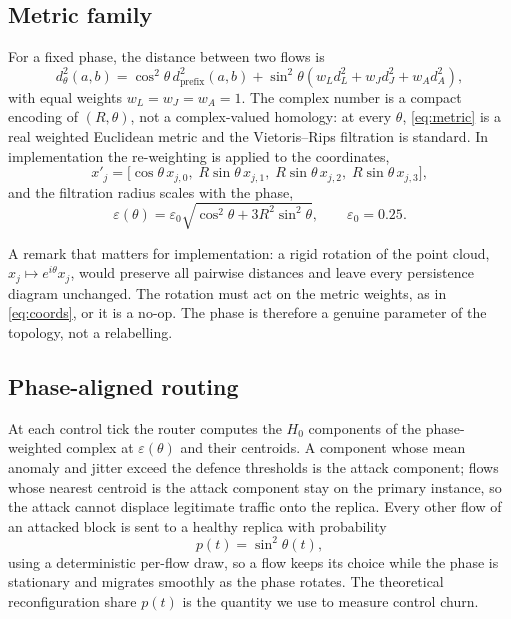 \documentclass[10pt,a4paper]{article}
\begin{document}
\subsection{Metric family}
For a fixed phase, the distance between two flows is
\begin{equation}
d_\theta^2(a,b)=\cos^2\theta\,d^2_{\mathrm{prefix}}(a,b)
+\sin^2\theta\left(w_L d_L^2+w_J d_J^2+w_A d_A^2\right),
\label{eq:metric}
\end{equation}
with equal weights $w_L=w_J=w_A=1$. The complex number is a compact encoding of
$(R,\theta)$, not a complex-valued homology: at every $\theta$, \eqref{eq:metric}
is a real weighted Euclidean metric and the Vietoris--Rips filtration is standard.
In implementation the re-weighting is applied to the coordinates,
\begin{equation}
x'_j=\big[\cos\theta\,x_{j,0},\; R\sin\theta\,x_{j,1},\;
R\sin\theta\,x_{j,2},\; R\sin\theta\,x_{j,3}\big],
\label{eq:coords}
\end{equation}
and the filtration radius scales with the phase,
\begin{equation}
\varepsilon(\theta)=\varepsilon_0\sqrt{\cos^2\theta+3R^2\sin^2\theta},
\qquad \varepsilon_0=0.25 .
\end{equation}

A remark that matters for implementation: a rigid rotation of the point cloud,
$x_j\mapsto e^{i\theta}x_j$, would preserve all pairwise distances and leave every
persistence diagram unchanged. The rotation must act on the metric weights, as in
\eqref{eq:coords}, or it is a no-op. The phase is therefore a genuine parameter of
the topology, not a relabelling.

\subsection{Phase-aligned routing}
At each control tick the router computes the $H_0$ components of the
phase-weighted complex at $\varepsilon(\theta)$ and their centroids. A component
whose mean anomaly and jitter exceed the defence thresholds is the attack
component; flows whose nearest centroid is the attack component stay on the
primary instance, so the attack cannot displace legitimate traffic onto the
replica. Every other flow of an attacked block is sent to a healthy replica with
probability
\begin{equation}
p(t)=\sin^2\theta(t),
\label{eq:share}
\end{equation}
using a deterministic per-flow draw, so a flow keeps its choice while the phase is
stationary and migrates smoothly as the phase rotates. The theoretical
reconfiguration share $p(t)$ is the quantity we use to measure control churn.
\end{document}
